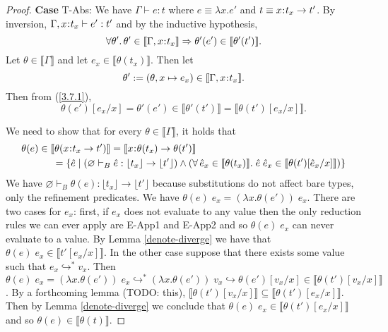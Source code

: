 \documentclass[11pt]{article}
\newcommand{\bind}{\hspace{0.05em}{:}\hspace{0.05em}} %
\newcommand{\lb}{\llbracket}         %
\newcommand{\rb}{\rrbracket}         %
\newcommand{\step}{\hookrightarrow}
\newcommand{\many}{\hookrightarrow^*}
\newcommand{\functype}[3]{#1\bind #2 \rightarrow #3}
\begin{document}
\begin{proof}
{\bf Case} {\sc T-Abs}: We have $\Gamma \vdash e : t$ where $e \equiv \lambda x.e'$ and $t \equiv \functype{x}{t_x}{t'}$. By inversion, $\Gamma,x\bind t_x \vdash e' : t'$ and by the inductive hypothesis,
\begin{equation}\label{3.7.1}
\forall\theta'.\, \theta' \in \lb\Gamma,x\bind t_x\rb \Rightarrow \theta'(e') \in \lb\theta'(t')\rb.\end{equation}
Let $\theta \in \lb\Gamma\rb$ and let $e_x \in \lb \theta(t_x)\rb$. Then let
\[\theta' := (\theta,x\mapsto e_x) \in \lb\Gamma,x\bind t_x\rb.
\] 
Then from (\ref{3.7.1}), 
\begin{equation}\label{3.7.2}
\theta(e')[e_x/x] = \theta'(e') \in \lb\theta'(t')\rb = \lb\theta(t')[e_x/x]\rb.
\end{equation}

We need to show that for every $\theta \in \lb\Gamma\rb$, it holds that 
\begin{align*}
\theta(e) \in \lb \theta(&\functype{x}{t_x}{t'}) \rb = \lb \functype{x}{\theta(t_x)}{\theta(t')}\rb\\
=&\; \{ \hat{e} \;|\; (\varnothing \vdash_B {\hat e} : \lfloor t_x \rfloor \rightarrow \lfloor t' \rfloor) \wedge ( \forall\, \hat e_x \in \lb \theta(t_x) \rb.\; \hat e \; \hat e_x \in \lb\theta(t')[\hat e_x/x] \rb) \}
\end{align*}
We have $\varnothing \vdash_B \theta(e) : \lfloor t_x \rfloor \rightarrow \lfloor t' \rfloor$ because substitutions do not affect bare types, only the refinement predicates.
We have
$\theta(e)\; e_x = (\lambda x.\theta(e'))\; e_x.$
There are two cases for $e_x$: first, if $e_x$ does not evaluate to any value then the only reduction rules we can ever apply are {\sc E-App1} and {\sc E-App2} and so $\theta(e)\; e_x$ can never evaluate to a value. By Lemma \ref{denote-diverge} we have that $\theta(e)\; e_x \in \lb t'[e_x/x]\rb$. In the other case suppose that there exists some value such that $e_x \many v_x$. Then 
$\theta(e)\; e_x = (\lambda x.\theta(e'))\; e_x \many (\lambda x.\theta(e'))\; v_x \step \theta(e')[v_x/x] \in \lb \theta(t')[v_x/x]\rb$. 
By a forthcoming lemma (TODO: this), $\lb\theta(t')[v_x/x]\rb \subseteq \lb\theta(t')[e_x/x]\rb$. Then by Lemma \ref{denote-diverge} we conclude that $\theta(e)\; e_x \in \lb\theta(t')[e_x/x]\rb$ and so $\theta(e) \in \lb\theta(t)\rb$.


\end{proof}
\end{document}
